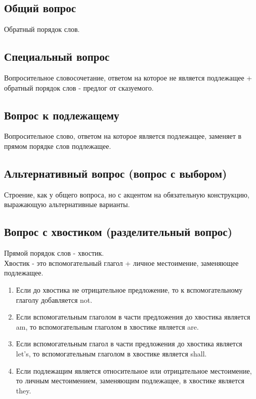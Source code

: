 \documentclass[oneside]{book}
\begin{document}
\subsection{Общий вопрос}
Обратный порядок слов.

\subsection{Специальный вопрос}
Вопросительное словосочетание, ответом на которое не является подлежащее
+ обратный порядок слов - предлог от сказуемого.

\subsection{Вопрос к подлежащему}
Вопросительное слово, ответом на которое является подлежащее,
заменяет в прямом порядке слов подлежащее.

\subsection{Альтернативный вопрос (вопрос с выбором)}
Строение, как у общего вопроса, но с акцентом на обязательную конструкцию,
выражающую альтернативные варианты.

\subsection{Вопрос с хвостиком (разделительный вопрос)}
Прямой порядок слов - хвостик.
\\
Хвостик - это вспомогательный глагол + личное местоимение, заменяющее подлежащее.

\begin{enumerate}
    \item Если до хвостика не отрицательное предложение, то
    к вспомогательному глаголу добавляется not.

    \item Если вспомогательным глаголом в части предложения
    до хвостика является am, то вспомогательным глаголом
    в хвостике является are.

    \item Если вспомогательным глагол в части предложения до
    хвостика является let's, то вспомогательным глаголом в
    хвостике является shall.

    \item Если подлежащим является относительное или отрицательное местоимение,
    то личным местоимением, заменяющим подлежащее, в хвостике является they.
\end{enumerate}
\end{document}
